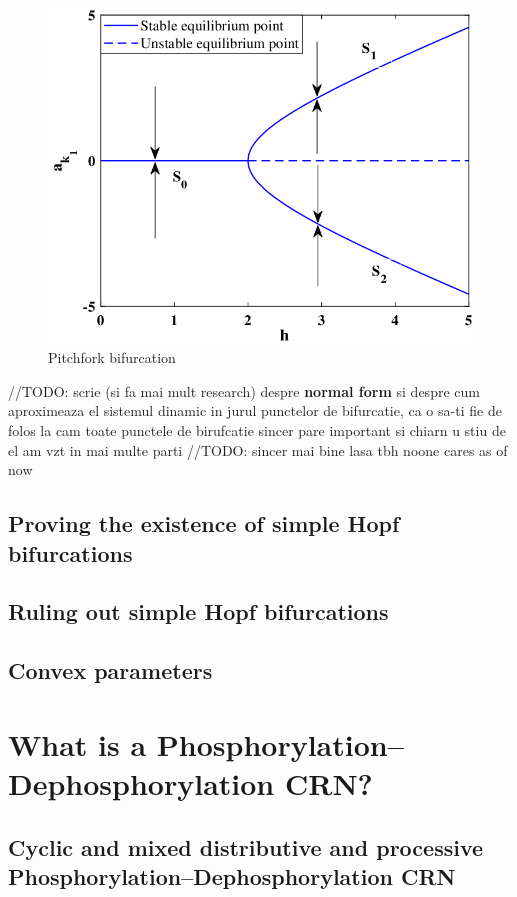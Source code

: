 \begin{figure}[H]
  \includegraphics[width=13cm]{math_pics/pitchfork-photo.png}
  \centering
  \caption{Pitchfork bifurcation}
\end{figure}

//TODO: scrie (si fa mai mult research) despre  \textbf{normal form} si despre cum aproximeaza el sistemul dinamic in jurul punctelor de bifurcatie, ca o sa-ti fie de folos la cam toate punctele de birufcatie sincer pare important si chiarn u stiu de el am vzt in mai multe parti
//TODO: sincer mai bine lasa tbh noone cares as of now

\subsection{Proving the existence of simple Hopf bifurcations}

\subsection{Ruling out simple Hopf bifurcations}

\subsection{Convex parameters}

\section{What is a Phosphorylation–Dephosphorylation CRN?}

\subsection{Cyclic and mixed distributive and processive Phosphorylation–Dephosphorylation CRN}
